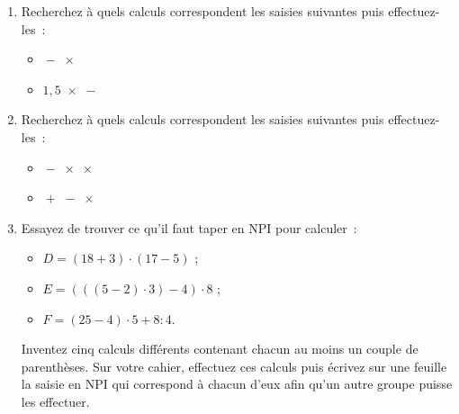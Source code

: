\begin{TP}
\begin{enumerate}
 \item Recherchez à quels calculs correspondent les saisies suivantes puis effectuez-les :
  \begin{itemize} 
  
  \vspace{1em}
  
  \item {} \quad {} \quad {} \quad {} \quad $\boxed{-}$ \quad {} \quad {} \quad $\boxed{\times}$ \\[-0.75em]
  \item {} \quad {} \quad {} \quad {} \quad $\boxed{1,5}$ \quad {} \quad $\boxed{\times}$ \quad $\boxed{-}$
  \end{itemize}
  

 \item Recherchez à quels calculs correspondent les saisies suivantes puis effectuez-les :
   \begin{itemize} 
  
  \vspace{1em}
  
  \item {} \quad {} \quad {} \quad {} \quad $\boxed{-}$ \quad {} \quad {} \quad $\boxed{\times}$ \quad {} \quad {} \quad $\boxed{\times}$\\[-0.75em]
  \item {} \quad {} \quad {} \quad {} \quad $\boxed{+}$ \quad {} \quad {} \quad {} \quad {} \quad $\boxed{-}$ \quad $\boxed{\times}$
  \end{itemize}
  
  \vspace{1em}
  
 \item Essayez de trouver ce qu'il faut taper en NPI pour calculer : 
 \begin{itemize}
  \item $D = (18 + 3) \cdot (17 - 5)$ ;
  \item $E = (((5 - 2) \cdot 3) - 4) \cdot 8$ ;
  \item $F = (25 - 4) \cdot 5 + 8 : 4$.
  \end{itemize}
Inventez cinq calculs différents contenant chacun au moins un couple de parenthèses. Sur votre cahier, effectuez ces calculs puis écrivez sur une feuille la saisie en NPI qui correspond à chacun d'eux afin qu'un autre groupe puisse les effectuer.

 \end{enumerate}
 
\end{TP}

